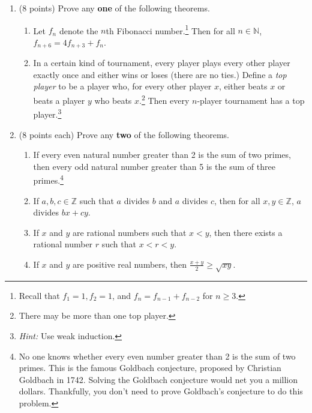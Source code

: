 \documentclass[11pt]{article}
\theoremstyle{definition}
\begin{document}
\begin{enumerate}

\item (8 points) Prove any \textbf{one} of the following theorems.

\begin{enumerate}

\item Let $f_n$ denote the $n$th Fibonacci number.\footnote{Recall that $f_1=1, f_2=1$, and $f_n=f_{n-1}+f_{n-2}$ for $n\geq 3$.}  Then for all $n\in\mathbb{N}$, $f_{n+6}=4f_{n+3}+f_n$.

\item In a certain kind of tournament, every player plays every other player exactly once and either wins or loses (there are no ties.)  Define a \emph{top player} to be a player who, for every other player $x$, either beats $x$ or beats a player $y$ who beats $x$.\footnote{There may be more than one top player.}  Then every $n$-player tournament has a top player.\footnote{\emph{Hint:} Use weak induction.}

\end{enumerate}

\item (8 points each) Prove any \textbf{two} of the following theorems.

\begin{enumerate}

\item If every even natural number greater than 2 is the sum of two primes, then every odd natural number greater than 5 is the sum of three primes.\footnote{No one knows whether every even number greater than 2 is the sum of two primes.  This is the famous Goldbach conjecture, proposed by Christian Goldbach in 1742.  Solving the Goldbach conjecture would net you a million dollars.  Thankfully, you don't need to prove Goldbach's conjecture to do this problem.}

\item If $a,b,c\in \mathbb{Z}$ such that $a$ divides $b$ and $a$ divides $c$, then for all $x,y\in \mathbb{Z}$, $a$ divides $bx+cy$.

\item If $x$ and $y$ are rational numbers such that $x<y$, then there exists a rational number $r$ such that $x<r<y$.

\item If $x$ and $y$ are positive real numbers, then $\displaystyle \frac{x+y}{2}\geq \sqrt{xy}$.

\end{enumerate}

\end{enumerate}
\end{document}
